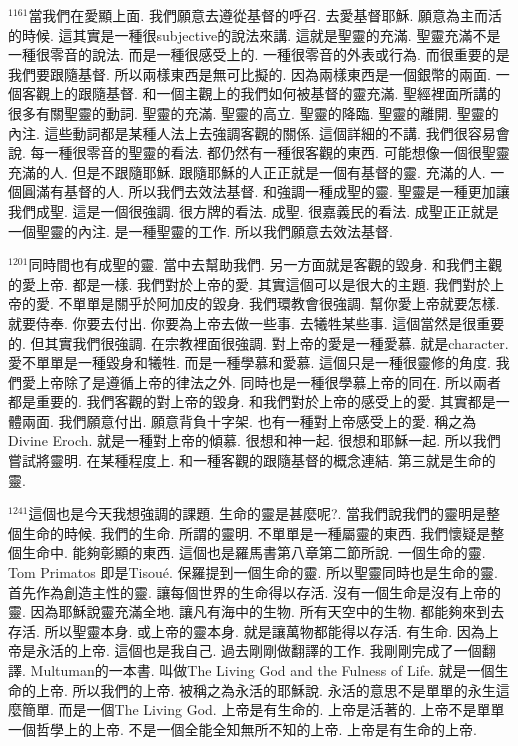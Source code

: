 \documentclass{book}
\begin{document}
$^{1161}$當我們在愛顯上面.
我們願意去遵從基督的呼召.
去愛基督耶穌.
願意為主而活的時候.
這其實是一種很subjective的說法來講.
這就是聖靈的充滿.
聖靈充滿不是一種很零音的說法.
而是一種很感受上的.
一種很零音的外表或行為.
而很重要的是我們要跟隨基督.
所以兩樣東西是無可比擬的.
因為兩樣東西是一個銀幣的兩面.
一個客觀上的跟隨基督.
和一個主觀上的我們如何被基督的靈充滿.
聖經裡面所講的很多有關聖靈的動詞.
聖靈的充滿.
聖靈的高立.
聖靈的降臨.
聖靈的離開.
聖靈的內注.
這些動詞都是某種人法上去強調客觀的關係.
這個詳細的不講.
我們很容易會說.
每一種很零音的聖靈的看法.
都仍然有一種很客觀的東西.
可能想像一個很聖靈充滿的人.
但是不跟隨耶穌.
跟隨耶穌的人正正就是一個有基督的靈.
充滿的人.
一個圓滿有基督的人.
所以我們去效法基督.
和強調一種成聖的靈.
聖靈是一種更加讓我們成聖.
這是一個很強調.
很方牌的看法.
成聖.
很嘉義民的看法.
成聖正正就是一個聖靈的內注.
是一種聖靈的工作.
所以我們願意去效法基督.

$^{1201}$同時間也有成聖的靈.
當中去幫助我們.
另一方面就是客觀的毀身.
和我們主觀的愛上帝.
都是一樣.
我們對於上帝的愛.
其實這個可以是很大的主題.
我們對於上帝的愛.
不單單是關乎於阿加皮的毀身.
我們環教會很強調.
幫你愛上帝就要怎樣.
就要侍奉.
你要去付出.
你要為上帝去做一些事.
去犧牲某些事.
這個當然是很重要的.
但其實我們很強調.
在宗教裡面很強調.
對上帝的愛是一種愛慕.
就是character.
愛不單單是一種毀身和犧牲.
而是一種學慕和愛慕.
這個只是一種很靈修的角度.
我們愛上帝除了是遵循上帝的律法之外.
同時也是一種很學慕上帝的同在.
所以兩者都是重要的.
我們客觀的對上帝的毀身.
和我們對於上帝的感受上的愛.
其實都是一體兩面.
我們願意付出.
願意背負十字架.
也有一種對上帝感受上的愛.
稱之為Divine Eroch.
就是一種對上帝的傾慕.
很想和神一起.
很想和耶穌一起.
所以我們嘗試將靈明.
在某種程度上.
和一種客觀的跟隨基督的概念連結.
第三就是生命的靈.

$^{1241}$這個也是今天我想強調的課題.
生命的靈是甚麼呢?.
當我們說我們的靈明是整個生命的時候.
我們的生命.
所謂的靈明.
不單單是一種屬靈的東西.
我們懷疑是整個生命中.
能夠彰顯的東西.
這個也是羅馬書第八章第二節所說.
一個生命的靈.
Tom Primatos 即是Tisoué.
保羅提到一個生命的靈.
所以聖靈同時也是生命的靈.
首先作為創造主性的靈.
讓每個世界的生命得以存活.
沒有一個生命是沒有上帝的靈.
因為耶穌說靈充滿全地.
讓凡有海中的生物.
所有天空中的生物.
都能夠來到去存活.
所以聖靈本身.
或上帝的靈本身.
就是讓萬物都能得以存活.
有生命.
因為上帝是永活的上帝.
這個也是我自己.
過去剛剛做翻譯的工作.
我剛剛完成了一個翻譯.
Multuman的一本書.
叫做The Living God and the Fulness of Life.
就是一個生命的上帝.
所以我們的上帝.
被稱之為永活的耶穌說.
永活的意思不是單單的永生這麼簡單.
而是一個The Living God.
上帝是有生命的.
上帝是活著的.
上帝不是單單一個哲學上的上帝.
不是一個全能全知無所不知的上帝.
上帝是有生命的上帝.
\end{document}
